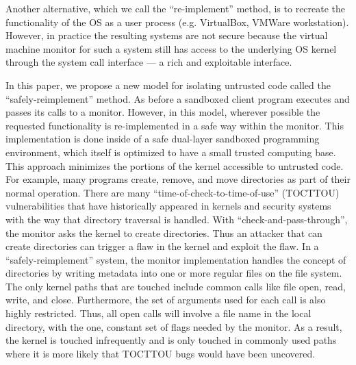 \par
Another alternative, which we call the ``re-implement'' method, is to
recreate the functionality of the OS as a user process (e.g. VirtualBox,
VMWare workstation). However, in practice the resulting systems are not
secure because the virtual machine monitor for such a system still has
access to the underlying OS kernel through the system call interface --- a
rich and exploitable interface.


\par
In this paper, we propose a new model for isolating untrusted code called
the ``safely-reimplement'' method. As before a sandboxed client program
executes and passes its calls to a monitor.  However, in this model,
wherever possible the requested functionality is re-implemented in a safe
way within the monitor. This implementation is done inside of a safe
dual-layer sandboxed programming environment, which itself is optimized to
have a small trusted computing base. This approach minimizes the portions
of the kernel accessible to untrusted code. For example, many programs
create, remove, and move directories as part of their normal operation.
There are many ``time-of-check-to-time-of-use'' (TOCTTOU) vulnerabilities
that have historically appeared in kernels and security systems with the
way that directory traversal is handled. With ``check-and-pass-through'',
the monitor asks the kernel to create directories. Thus an attacker that
can create directories can trigger a flaw in the kernel and exploit the
flaw. In a ``safely-reimplement'' system, the monitor implementation
handles the concept of directories by writing metadata into one or more
regular files on the file system. The only kernel paths that are touched
include common calls like file open, read, write, and close. Furthermore,
the set of arguments used for each call is also highly restricted. Thus,
all open calls will involve a file name in the local directory, with the
one, constant set of flags needed by the monitor. As a result, the kernel
is touched infrequently and is only touched in commonly used paths where it
is more likely that TOCTTOU bugs would have been uncovered.


